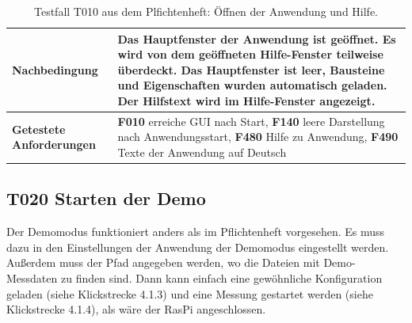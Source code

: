 \documentclass[parskip=full]{scrartcl}
\begin{document}
\begin{table}[h]
\begin{tabular}{| p{4cm} | p{10cm} |}
	\textbf{Nachbedingung}
	& 
	Das Hauptfenster der Anwendung ist geöffnet. Es wird von dem geöffneten Hilfe-Fenster teilweise überdeckt. Das Hauptfenster ist leer, Bausteine und Eigenschaften wurden automatisch geladen. Der Hilfstext wird im Hilfe-Fenster angezeigt.
	\\ \hline
	
	
	\textbf{Getestete Anforderungen}
	& 
	\textbf{F010} erreiche GUI nach Start, \textbf{F140} leere Darstellung nach Anwendungsstart, \textbf{F480} Hilfe zu Anwendung, \textbf{F490} Texte der Anwendung auf Deutsch
	\\ \hline
	
	
	
\end{tabular}
\caption{Testfall T010 aus dem Plfichtenheft: Öffnen der Anwendung und Hilfe.}
\label{testfallT010}
\end{table}




\subsection{\textbf{T020} Starten der Demo}

Der Demomodus funktioniert anders als im Pflichtenheft vorgesehen. Es muss dazu in den Einstellungen der Anwendung der Demomodus eingestellt werden. Außerdem muss der Pfad angegeben werden, wo die Dateien mit Demo-Messdaten zu finden sind.  Dann kann einfach eine gewöhnliche Konfiguration geladen (siehe Klickstrecke 4.1.3) und eine Messung gestartet werden (siehe Klickstrecke 4.1.4), als wäre der \gls{RasPi} angeschlossen.
\end{document}
